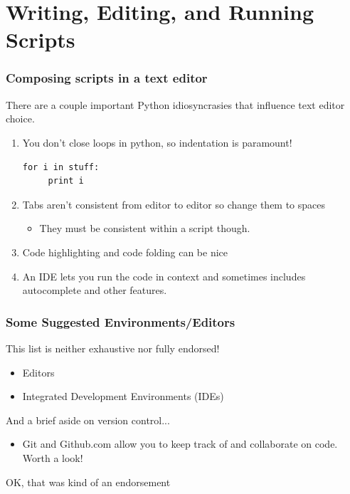 \documentclass{beamer}
\begin{document}
\section[]{Writing, Editing, and Running Scripts}
\begin{frame}[fragile]
\frametitle{Composing scripts in a text editor}
There are a couple important Python idiosyncrasies that influence text editor choice.
\begin{enumerate}
\item You don't close loops in python, so indentation is paramount!
\pause
\begin{lstlisting}
for i in stuff:
     print i
\end{lstlisting}
\pause
\item Tabs aren't consistent from editor to editor so change them to spaces
\begin{itemize}
\item They must be consistent within a script though.
\end{itemize}
\item Code highlighting and code folding can be nice
\pause
\item An IDE lets you run the code in context and sometimes includes autocomplete and other features.

\end{enumerate}
\end{frame}

\begin{frame}[fragile]
\frametitle{Some Suggested Environments/Editors}
This list is neither exhaustive nor fully endorsed!
\begin{itemize}
\item Editors
\item Integrated Development Environments (IDEs)
\end{itemize}
\pause
And a brief aside on version control...
\begin{itemize}
\item Git and Github.com allow you to keep track of and collaborate on code. Worth a look!
\end{itemize}
\pause
\begin{tiny}
OK, that was kind of an endorsement
\end{tiny}
\end{frame}
\end{document}
